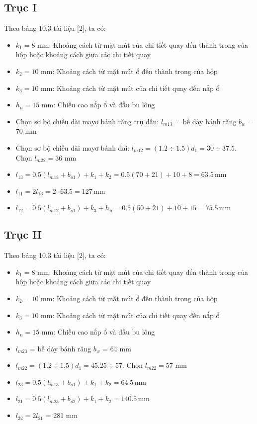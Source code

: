 \subsection{Trục I}
Theo bảng 10.3 tài liệu [2], ta có:
\begin{itemize}
    \item $k_1 = 8$ mm: Khoảng cách từ mặt mút của chi tiết quay đến thành trong của hộp hoặc khoảng cách giữa các chi tiết quay
    \item $k_2 = 10$ mm: Khoảng cách từ mặt mút ổ đến thành trong của hộp
    \item $k_3 = 10$ mm: Khoảng cách từ mặt mút của chi tiết quay đến nắp ổ
    \item $h_n = 15$ mm: Chiều cao nắp ổ và đầu bu lông
    \item Chọn sơ bộ chiều dài mayơ bánh răng trụ dẫn: $l_{m13}$ = bề dày bánh răng $b_w$ = 70 mm
    \item Chọn sơ bộ chiều dài mayơ bánh đai: $l_{m12} = (1.2\div 1.5)d_1 = 30 \div 37.5$. Chọn $l_{m22}=36$ mm 
    \item $l_{13} = 0.5(l_{m13} + b_{o1}) + k_1 + k_2 = 0.5(70 + 21) + 10 + 8 = 63.5 \, \text{mm}$
    \item $l_{11} = 2l_{13} = 2 \cdot 63.5 = 127 \, \text{mm}$
 
    \item $l_{12} = 0.5(l_{m12} + b_{o1}) + k_3 + h_n = 0.5(50 + 21) + 10 + 15 = 75.5 \, \text{mm}$
\end{itemize}

\subsection{Trục II}
Theo bảng 10.3 tài liệu [2], ta có:
\begin{itemize}
    \item $k_1 = 8$ mm: Khoảng cách từ mặt mút của chi tiết quay đến thành trong của hộp hoặc khoảng cách giữa các chi tiết quay
    \item $k_2 = 10$ mm: Khoảng cách từ mặt mút ổ đến thành trong của hộp
    \item $k_3 = 10$ mm: Khoảng cách từ mặt mút của chi tiết quay đến nắp ổ
    \item $h_n = 15$ mm: Chiều cao nắp ổ và đầu bu lông
    \item $l_{m23}$ = bề dày bánh răng $b_w$ = 64 mm
    \item $l_{m22} = (1.2\div 1.5)d_1 = 45.25 \div 57$. Chọn $l_{m22}=57$ mm
    \item $l_{23} = 0.5(l_{m13} + b_{o1}) + k_1 + k_2 = 64.5 \, \text{mm}$
    \item $l_{21} = 0.5(l_{m23} + b_{o2}) + k_1 + k_2 = 140.5 \, \text{mm}$
    \item $l_{22} = 2l_{21}$ = 281 mm
\end{itemize}

